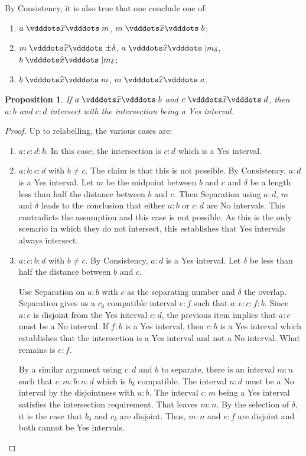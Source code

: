 \documentclass[12pt]{article}
\newtheorem{proposition}{Proposition}[section]
\begin{document}
By Consistency, it is also true that one conclude one of: 
    \begin{enumerate}
        \item $a\xora m$, \sout{$m \xora b$};
        \item $m\xora \pm \delta$, \sout{$a \xora |m_\delta$}, \sout{$b \xora |m_\delta$};
        \item $b \xora m$, \sout{$m \xora a$}.
    \end{enumerate}

\begin{proposition}
    If $ a\xora b$ and $c \xora d$, then $a:b$ and $c:d$ intersect with the intersection being a Yes interval. 
\end{proposition}

\begin{proof}
    Up to relabelling, the various cases are: 
    \begin{enumerate}
        \item $a:c:d:b$. In this case, the intersection is $c:d$ which is a Yes interval. 
        \item $a:b:c:d$ with $b \neq c$. The claim is that this is not possible. By Consistency, $a:d$ is a Yes interval. Let $m$ be the midpoint between $b$ and $c$ and $\delta$ be a length less than half the distance between $b$ and $c$. Then Separation using $a:d$, $m$ and $\delta$ leads to the conclusion that either $a:b$ or $c:d$ are No intervals. This contradicts the assumption and this case is not possible. As this is the only scenario in which they do not intersect, this establishes that Yes intervals always intersect. 
        \item $a:c:b:d$ with $b \neq c$. By Consistency, $a:d$ is a Yes interval. Let $\delta$ be less than half the distance between $b$ and $c$. 
        
        Use Separation on $a:b$ with $c$ as the separating number and $\delta$ the overlap. Separation gives us a $c_\delta$ compatible interval $e:f$ such that $a:e:c:f:b$. Since $a:e$ is disjoint from the Yes interval $c:d$, the previous item implies that $a:e$ must be a No interval. If $f:b$ is a Yes interval, then $c:b$ is a Yes interval which establishes that the intersection is a Yes interval and not a No interval. What remains is $e:f$. 

        By a similar argument using $c:d$ and $b$ to separate, there is an interval $m:n$ such that $c:m:b:n:d$ which is $b_\delta$ compatible. The interval $n:d$ must be a No interval by the disjointness with $a:b$. The interval $c:m$ being a Yes interval satisfies the intersection requirement. That leaves $m:n$. By the selection of $\delta$, it is the case that $b_\delta$ and $c_\delta$ are disjoint. Thus, $m:n$ and $e:f$ are disjoint and both cannot be Yes intervals. 


\end{enumerate}
\end{proof}
\end{document}
